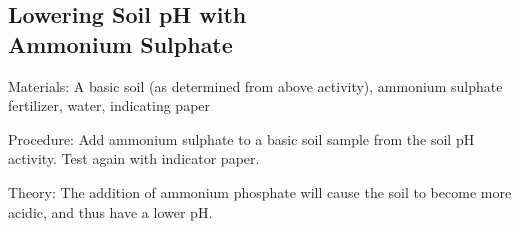 \begin{multicols}{2}
\subsection[Lowering Soil pH with Ammonium Sulphate]{Lowering Soil pH with \hfill \\ Ammonium Sulphate}


\begin{description*}
\item[Materials:]{A basic soil (as determined from above activity), ammonium sulphate fertilizer, water,  indicating paper}
\item[Procedure:]{Add ammonium sulphate to a basic soil sample from the soil pH activity. Test again with indicator paper.}
\item[Theory:]{The addition of ammonium phosphate will cause the soil to become more acidic, and thus have a lower pH.}
\end{description*}


\end{multicols}

\pagebreak